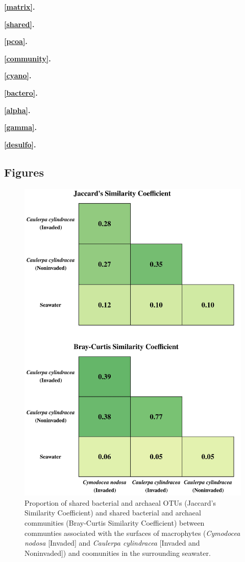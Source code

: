 \documentclass[12pt,]{article}
\begin{document}
\textbf{\autoref{matrix}.} 

\textbf{\autoref{shared}.} 

\textbf{\autoref{pcoa}.} 

\textbf{\autoref{community}.} 

\textbf{\autoref{cyano}.} 

\textbf{\autoref{bactero}.} 

\textbf{\autoref{alpha}.} 

\textbf{\autoref{gamma}.} 

\textbf{\autoref{desulfo}.} 

\hypertarget{figures}{%
\subsection{Figures}\label{figures}}

\begin{figure}[H]

{\centering \includegraphics[width=0.7\linewidth]{../results/figures/matrix} 

}

\caption{Proportion of shared bacterial and archaeal OTUs (Jaccard's Similarity Coefficient) and shared bacterial and archaeal communities (Bray-Curtis Similarity Coefficient) between communties associated with the surfaces of macrophytes (\textit{Cymodocea nodosa} [Invaded] and \textit{Caulerpa cylindracea} [Invaded and Noninvaded]) and coomunities in the surrounding seawater.\label{matrix}}\label{fig:unnamed-chunk-1}
\end{figure}
\end{document}

